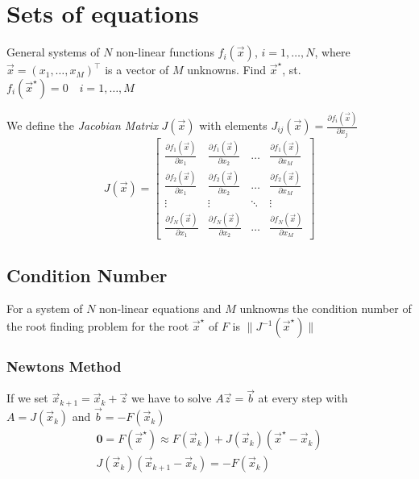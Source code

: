 \section{Sets of equations}
    General systems of $N$ non-linear functions $f_i(\Vec{x})$, $i=1,\dots,N$, where $\Vec{x}= (x_1, \dots, x_M)^\top$ is a vector of $M$ unknowns. Find $\Vec{x}^\star$, st. $f_i(\Vec{x}^\star) = 0 \quad i = 1,\dots,M$
    
    We define the \textit{Jacobian Matrix} $J(\Vec{x})$ with elements $J_{ij}(\Vec{x}) = \frac{\partial f_i(\Vec{x})}{\partial x_j}$
    \begin{equation*}
        J(\Vec{x}) = 
        \begin{bmatrix}
            \frac{\partial f_1(\Vec{x})}{\partial x_1} & \frac{\partial f_1(\Vec{x})}{\partial x_2} & \dots & \frac{\partial f_1(\Vec{x})}{\partial x_M}\\
            \frac{\partial f_2(\Vec{x})}{\partial x_1} & \frac{\partial f_2(\Vec{x})}{\partial x_2} & \dots & \frac{\partial f_2(\Vec{x})}{\partial x_M}\\
            \vdots & \vdots & \ddots & \vdots\\
            \frac{\partial f_N(\Vec{x})}{\partial x_1} & \frac{\partial f_N(\Vec{x})}{\partial x_2} & \dots &  \frac{\partial f_N(\Vec{x})}{\partial x_M}
        \end{bmatrix}
    \end{equation*}
    
    \subsection{Condition Number}
        For a system of $N$ non-linear equations and $M$ unknowns the condition number of the root finding problem for the root $\Vec{x}^\star$ of $F$ is $\|J^{-1}(\Vec{x}^\star)\|$
    
    \subsubsection{Newtons Method}
    If we set $\Vec{x}_{k+1} = \Vec{x}_k + \Vec{z}$ we have to solve $A\Vec{z} = \Vec{b}$ at every step with $A = J(\Vec{x}_k)$ and $\Vec{b} = -F(\Vec{x}_k)$
    \begin{gather*}
        \mathbf{0}=F(\Vec{x}^\star) \approx F(\Vec{x}_k) + J(\Vec{x}_k)(\Vec{x}^\star -\Vec{x}_k)\\
        J(\Vec{x}_k)(\Vec{x}_{k+1} - \Vec{x}_k) = -F(\Vec{x}_k)
    \end{gather*}
    
